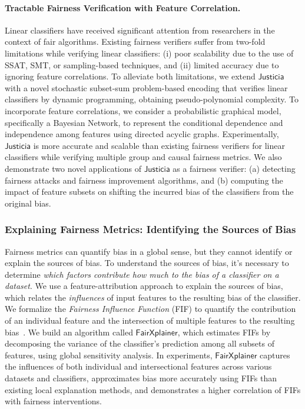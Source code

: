 \documentclass[11pt]{article}
\begin{document}
	
	\paragraph{Tractable Fairness Verification with Feature Correlation.} Linear classifiers have received significant attention from researchers in the context of fair algorithms. Existing fairness verifiers suffer from two-fold limitations while verifying linear classifiers: (i) poor scalability due to the use of SSAT, SMT, or sampling-based techniques, and (ii) limited accuracy due to ignoring feature correlations. To alleviate both limitations, we extend $\mathsf{Justicia}$ with a novel stochastic subset-sum problem-based encoding that verifies linear classifiers by dynamic programming, obtaining pseudo-polynomial complexity. To incorporate feature correlations, we consider a probabilistic graphical model, specifically a Bayesian Network, to represent the conditional dependence and independence among features using directed acyclic graphs. Experimentally, $\mathsf{Justicia}$ is more accurate and scalable than existing fairness verifiers for linear classifiers while verifying multiple group and causal fairness metrics. We also demonstrate two novel applications of $\mathsf{Justicia}$ as a fairness verifier: (a) detecting fairness attacks and fairness improvement algorithms, and (b) computing the impact of feature subsets on shifting the incurred bias of the classifiers from the original bias.
	
	
	
	
	
	
	\subsubsection*{Explaining Fairness Metrics: Identifying the Sources of Bias}
	Fairness metrics can quantify bias in a global sense, but they cannot identify or explain the sources of bias. To understand the sources of bias, it's necessary to determine \textit{which factors contribute how much to the bias of a classifier on a dataset}. We use a feature-attribution approach to explain the sources of bias, which relates the \emph{influences} of input features to the resulting bias of the classifier. We formalize the \textit{Fairness Influence Function} (FIF) to quantify the contribution of an individual feature and the intersection of multiple features to the resulting bias~\cite{ghosh2022how}. We build an algorithm called $\mathsf{FairXplainer}$, which estimates FIFs by decomposing the variance of the classifier's prediction among all subsets of features, using global sensitivity analysis. In experiments, $\mathsf{FairXplainer}$ captures the influences of both individual and intersectional features across various datasets and classifiers, approximates bias more accurately using FIFs than existing local explanation methods, and demonstrates a higher correlation of FIFs with fairness interventions.
	
\end{document}
